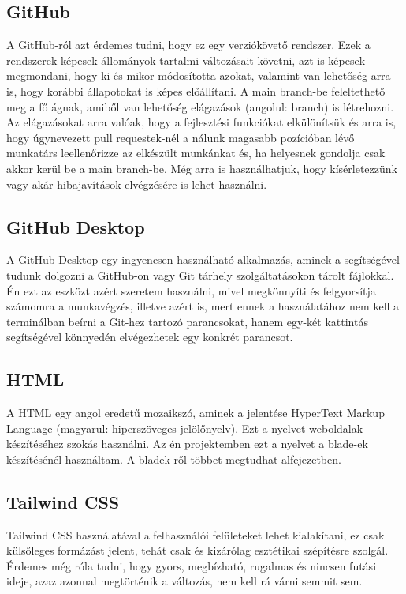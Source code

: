 \documentclass[]{thesis-ekf}
\theoremstyle{definition}
\theoremstyle{remark}
\begin{document}
	\subsection{GitHub}
		A GitHub-ról azt érdemes tudni, hogy ez egy verziókövető rendszer. Ezek a rendszerek képesek állományok tartalmi változásait követni, azt is képesek megmondani, hogy ki és mikor módosította azokat, valamint van lehetőség arra is, hogy korábbi állapotokat is képes előállítani. A main branch-be feleltethető meg a fő ágnak, amiből van lehetőség elágazások (angolul: branch) is létrehozni. Az elágazásokat arra valóak, hogy a fejlesztési funkciókat elkülönítsük és arra is, hogy úgynevezett pull requestek-nél a nálunk magasabb pozícióban lévő munkatárs leellenőrizze az elkészült munkánkat és, ha helyesnek gondolja csak akkor kerül be a main branch-be. Még arra is használhatjuk, hogy kísérletezzünk vagy akár hibajavítások elvégzésére is lehet használni.
	\subsection{GitHub Desktop}
		A GitHub Desktop egy ingyenesen használható alkalmazás, aminek a segítségével tudunk dolgozni a GitHub-on vagy Git tárhely szolgáltatásokon tárolt fájlokkal. Én ezt az eszközt azért szeretem használni, mivel megkönnyíti és felgyorsítja számomra a munkavégzés, illetve azért is, mert ennek a használatához nem kell a terminálban beírni a Git-hez tartozó parancsokat, hanem egy-két kattintás segítségével könnyedén elvégezhetek egy konkrét parancsot. \cite{GitHubDesktop}
	\subsection{HTML}
		A HTML egy angol eredetű mozaikszó, aminek a jelentése HyperText Markup Language (magyarul: hiperszöveges jelölőnyelv). Ezt a nyelvet weboldalak készítéséhez szokás használni. Az én projektemben ezt a nyelvet a blade-ek készítésénél használtam. A bladek-ről többet megtudhat  alfejezetben.   
	\subsection{Tailwind CSS}\label{sc-tailwind}
		Tailwind CSS használatával a felhasználói felületeket lehet kialakítani, ez csak külsőleges formázást jelent, tehát csak és kizárólag esztétikai szépítésre szolgál. Érdemes még róla tudni, hogy gyors, megbízható, rugalmas és nincsen futási ideje, azaz azonnal megtörténik a változás, nem kell rá várni semmit sem. \cite{tailwind}
\end{document}
